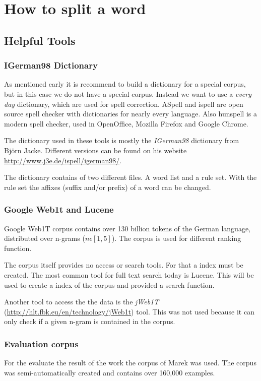 \documentclass[11pt, accentcolor=tud9b, nochapname]{tudreport}
\begin{document}
\chapter{How to split a word}

\section{Helpful Tools}

\subsection{IGerman98 Dictionary}
As mentioned early it is recommend to build a dictionary for a special
corpus, but in this case we do not have a special corpus. Instead we
want to use a \emph{every day} dictionary, which are used for spell
correction. ASpell and ispell are open source spell checker with
dictionaries for nearly every language. Also hunspell is a modern
spell checker, used in OpenOffice, Mozilla Firefox and Google
Chrome.

The dictionary used in these tools is mostly the \emph{IGerman98}
dictionary from Björn Jacke. Different versions can be found
on his website \url{http://www.j3e.de/ispell/igerman98/}.

The dictionary contains of two different files. A word list
and a rule set. With the rule set the affixes (suffix and/or prefix)
of a word can be changed.

\subsection{Google Web1t and Lucene}
Google Web1T corpus contains over 130 billion tokens of the German
language, distributed over n-grams ($n \epsilon [1,5]$). The corpus
is used for different ranking function.

The corpus itself provides no access or search tools. For that a index must be
created. The most common tool for full text search today
is Lucene. This will be used to create a index of the
corpus and provided a search function.

Another tool to access the the data is the \emph{jWeb1T}
(\url{http://hlt.fbk.eu/en/technology/jWeb1t}) tool. This
was not used because it can only check if a given n-gram
is contained in the corpus.

\subsection{Evaluation corpus}
For the evaluate the result of the work the corpus of Marek
\cite{marek} was used. The corpus was semi-automatically
created and contains over 160,000 examples.
\end{document}
